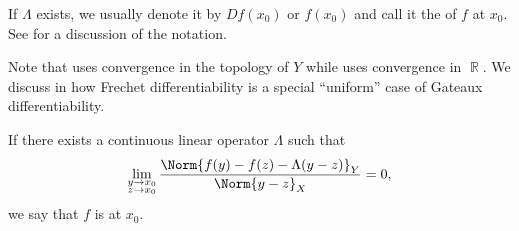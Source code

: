 \begin{definition}
\begin{DefEnum}
    If \( \Lambda \) exists, we usually denote it by \( D f(x_0) \) or \( f(x_0) \) and call it the  of \( f \) at \( x_0 \). See  for a discussion of the notation.

    Note that  uses convergence in the topology of \( Y \) while  uses convergence in \( \BbbR \). We discuss in  how Frechet differentiability is a special \enquote{uniform} case of Gateaux differentiability.

    If there exists a continuous linear operator \( \Lambda \) such that
    \begin{equation}\label{def:differentiability/strict/condition}
      \lim_{\substack{y \to x_0 \\ z \to x_0}} \frac {\Norm{f(y) - f(z) - \Lambda (y - z)}_Y} {\Norm{y - z}_X} = 0,
    \end{equation}
    we say that \( f \) is  at \( x_0 \).
  \end{DefEnum}
\end{definition}

